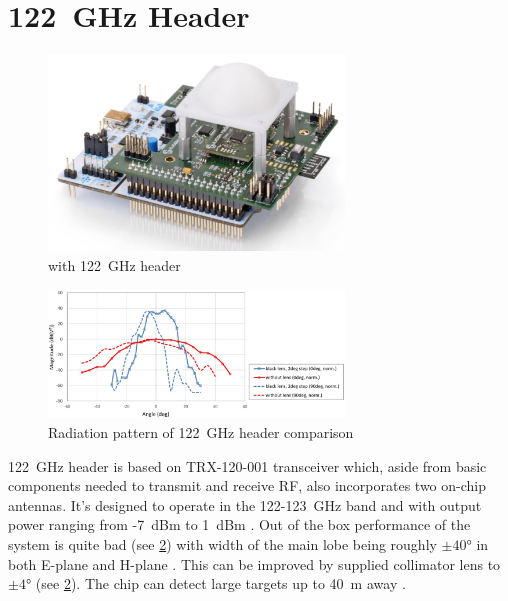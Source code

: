 \section{122~GHz Header}

\begin{figure}[h!]
	\centering
	\includegraphics[width=0.7\textwidth]{../img/sidar122.png}
	\caption[\sidar with 122~GHz header \cite{sidarPRO}]{\sidar with 122~GHz header}
	\label{fig:sidar122}
\end{figure}

\begin{figure}[h!]
	\centering
	\includegraphics[width=0.7\textwidth]{../img/sidar122rad.jpg}
	\caption[Radiation pattern of 122~GHz header comparison \cite{sidarTRX122col}]{Radiation pattern of 122~GHz header comparison}
	\label{fig:sidar122rad}
\end{figure}

122~GHz header is based on TRX-120-001 transceiver which, aside from basic components needed to transmit and receive RF, also incorporates two on-chip antennas.
It's designed to operate in the 122-123~GHz band and with output power ranging from -7~dBm to 1~dBm \cite{sidarTRX122}.
Out of the box performance of the system is quite bad (see \ref{fig:sidar122rad}) with width of the main lobe being roughly $\pm40\text{°}$ in both E-plane and H-plane \cite{sidarTRX122}.
This can be improved by supplied collimator lens to $\pm4\text{°}$ \cite{sidarTRX122col} (see \ref{fig:sidar122rad}).
The chip can detect large targets up to 40~m away \cite{sidarMANOld}.




